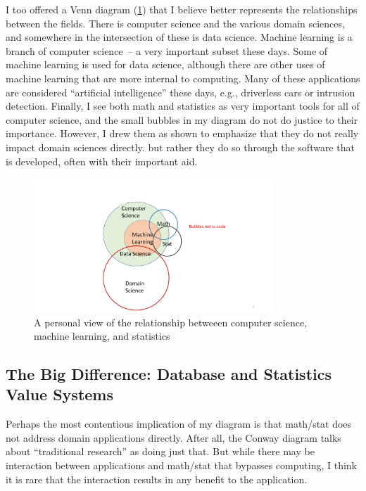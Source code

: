 \documentclass[11pt]{article}
\begin{document}
I too offered a Venn diagram (\ref{myvenn-fig}) that I believe better represents the relationships between the fields.  There is computer science and the various domain sciences, and somewhere in the intersection of these is data science.  Machine learning is a branch of computer science~-- a very important subset these days.  Some of machine learning is used for data science, although there are other uses of machine learning that are more internal to computing.  Many of these applications are considered ``artificial intelligence'' these days, e.g., driverless cars or intrusion detection.  Finally, I see both math and statistics as very important tools for all of computer science, and the small bubbles in my diagram do not do justice to their importance.  However, I drew them as shown to emphasize that they do not really impact domain sciences directly.  but rather they do so through the software that is developed, often with their important aid.

\begin{figure}[h]
\centerline{\includegraphics[width=0.8\textwidth]{letters/myvenn.pdf}}
\caption{A personal view of the relationship betweeen computer science, machine learning, and statistics}
\label{myvenn-fig}
\end{figure}

\subsection{The Big Difference: Database and Statistics Value Systems}

Perhaps the most contentious implication of my diagram is that math/stat does not address domain applications directly.  After all, the Conway diagram talks about ``traditional research'' as doing just that.  But while there may be interaction between applications and math/stat that bypasses computing, I think it is rare that the interaction results in any benefit to the application.
\end{document}
